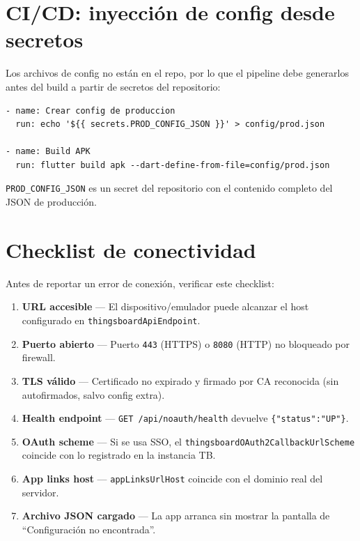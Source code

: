\documentclass[12pt, a4paper]{article}
\begin{document}
\section{CI/CD: inyección de config desde secretos}

Los archivos de config no están en el repo, por lo que el pipeline debe
generarlos antes del build a partir de secretos del repositorio:

\begin{lstlisting}[style=bash, caption=Ejemplo GitHub Actions]
- name: Crear config de produccion
  run: echo '${{ secrets.PROD_CONFIG_JSON }}' > config/prod.json

- name: Build APK
  run: flutter build apk --dart-define-from-file=config/prod.json
\end{lstlisting}

\texttt{PROD\_CONFIG\_JSON} es un secret del repositorio con el contenido
completo del JSON de producción.

\section{Checklist de conectividad}

Antes de reportar un error de conexión, verificar este checklist:

\begin{enumerate}[label=\textcolor{galiogreen}{\checkmark}]
  \item \textbf{URL accesible} --- El dispositivo/emulador puede alcanzar el
        host configurado en \texttt{thingsboardApiEndpoint}.
  \item \textbf{Puerto abierto} --- Puerto \texttt{443} (HTTPS) o \texttt{8080}
        (HTTP) no bloqueado por firewall.
  \item \textbf{TLS válido} --- Certificado no expirado y firmado por CA
        reconocida (sin autofirmados, salvo config extra).
  \item \textbf{Health endpoint} --- \texttt{GET /api/noauth/health} devuelve
        \texttt{\{"status":"UP"\}}.
  \item \textbf{OAuth scheme} --- Si se usa SSO, el
        \texttt{thingsboardOAuth2CallbackUrlScheme} coincide con lo registrado
        en la instancia TB.
  \item \textbf{App links host} --- \texttt{appLinksUrlHost} coincide con el
        dominio real del servidor.
  \item \textbf{Archivo JSON cargado} --- La app arranca sin mostrar la
        pantalla de ``Configuración no encontrada''.
\end{enumerate}
\end{document}
